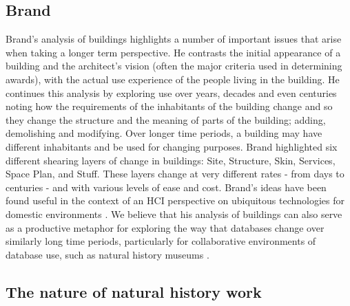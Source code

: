 \subsection{Brand}

Brand’s analysis of buildings \cite{brand1995buildings} highlights a number of important issues that arise when taking a longer term perspective. He contrasts the initial appearance of a building and the architect’s vision (often the major criteria used in determining awards), with the actual use experience of the people living in the building. He continues this analysis by exploring use over years, decades and even centuries noting how the requirements of the inhabitants of the building change and so they change the structure and the meaning of parts of the building; adding, demolishing and modifying. Over longer time periods, a building may have different inhabitants and be used for changing purposes. Brand highlighted six different shearing layers of change in buildings: Site, Structure, Skin, Services, Space Plan, and Stuff. These layers change at very different rates - from days to centuries - and with various levels of ease and cost. Brand’s ideas have been found useful in the context of an HCI perspective on ubiquitous technologies for domestic environments \cite{rodden2003evolution}. We believe that his analysis of buildings can also serve as a productive metaphor for exploring the way that databases change over similarly long time periods, particularly for collaborative environments of database use, such as natural history museums  \cite{thomer2014databases}. 

\subsection{The nature of natural history work}

